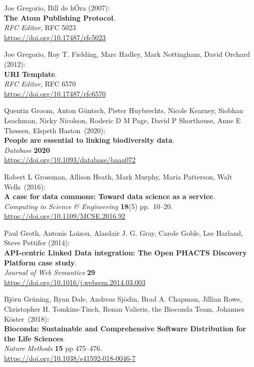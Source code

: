 \begin{thebibliography}{9}
Joe Gregorio, Bill de hÓra (2007): \\
\textbf{The {Atom Publishing Protocol}}.\\
\emph{RFC Editor}, RFC 5023\\
\url{https://doi.org/10.17487/rfc5023}

Joe Gregorio, Roy T. Fielding, Marc Hadley, Mark Nottingham, David Orchard (2012):\\
\textbf{{URI Template}}.\\
\emph{RFC Editor}, RFC 6570 \\
\url{https://doi.org/10.17487/rfc6570}

Quentin Groom, Anton Güntsch, Pieter Huybrechts, Nicole Kearney, Siobhan Leachman, Nicky Nicolson, Roderic D M Page, David P Shorthouse, Anne E Thessen, Elspeth Haston~(2020):\\
\textbf{People are essential to linking biodiversity data}.\\
\emph{Database} \textbf{2020}\\
\url{https://doi.org/10.1093/database/baaa072}

Robert L Grossman, Allison Heath, Mark Murphy, Maria Patterson,
Walt Wells~(2016):\\
\textbf{A case for data commons: Toward data science as a service}.\\
\emph{Computing in Science \& Engineering} \textbf{18}(5) pp.~10--20.\\
\url{https://doi.org/10.1109/MCSE.2016.92}

Paul Groth, Antonis Loizou, Alasdair J. G. Gray, Carole Goble, Lee
Harland, Steve Pettifer (2014): \\
\textbf{API-centric Linked Data integration: {The Open PHACTS Discovery Platform} case study}.\\
\emph{Journal of Web Semantics} \textbf{29} \\
\url{https://doi.org/10.1016/j.websem.2014.03.003}

Björn Grüning, Ryan Dale, Andreas Sjödin, Brad A. Chapman,
Jillian Rowe, Christopher H. Tomkins-Tinch, Renan Valieris, the Bioconda
Team, Johannes Köster~(2018):\\
\textbf{Bioconda: Sustainable and Comprehensive Software Distribution
for the Life Sciences}.\\
\emph{Nature Methods} \textbf{15} pp 475--476.\\
\url{https://doi.org/10.1038/s41592-018-0046-7}


\end{thebibliography}

